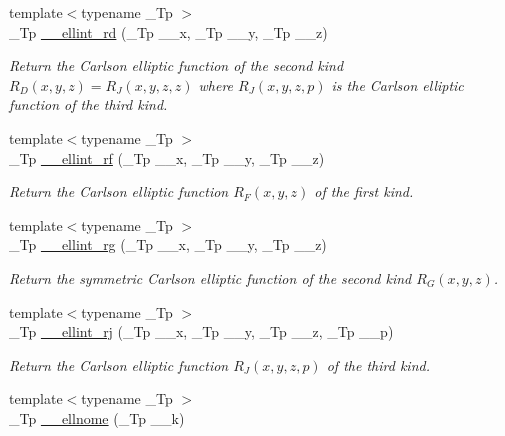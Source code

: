 \begin{DoxyCompactItemize}
{\footnotesize template$<$typename \+\_\+\+Tp $>$ }\\\+\_\+\+Tp \hyperlink{namespacestd_1_1____detail_ac05883415a662fc6f9855dd8d1da921f}{\+\_\+\+\_\+ellint\+\_\+rd} (\+\_\+\+Tp \+\_\+\+\_\+x, \+\_\+\+Tp \+\_\+\+\_\+y, \+\_\+\+Tp \+\_\+\+\_\+z)
\begin{DoxyCompactList}\small\item\em Return the Carlson elliptic function of the second kind $ R_D(x,y,z) = R_J(x,y,z,z) $ where $ R_J(x,y,z,p) $ is the Carlson elliptic function of the third kind. \end{DoxyCompactList}\item 
{\footnotesize template$<$typename \+\_\+\+Tp $>$ }\\\+\_\+\+Tp \hyperlink{namespacestd_1_1____detail_a2cca271dcbdf22923219eab7a02450d5}{\+\_\+\+\_\+ellint\+\_\+rf} (\+\_\+\+Tp \+\_\+\+\_\+x, \+\_\+\+Tp \+\_\+\+\_\+y, \+\_\+\+Tp \+\_\+\+\_\+z)
\begin{DoxyCompactList}\small\item\em Return the Carlson elliptic function $ R_F(x,y,z) $ of the first kind. \end{DoxyCompactList}\item 
{\footnotesize template$<$typename \+\_\+\+Tp $>$ }\\\+\_\+\+Tp \hyperlink{namespacestd_1_1____detail_aaceff1eb320e0602afee36c60b80f87a}{\+\_\+\+\_\+ellint\+\_\+rg} (\+\_\+\+Tp \+\_\+\+\_\+x, \+\_\+\+Tp \+\_\+\+\_\+y, \+\_\+\+Tp \+\_\+\+\_\+z)
\begin{DoxyCompactList}\small\item\em Return the symmetric Carlson elliptic function of the second kind $ R_G(x,y,z) $. \end{DoxyCompactList}\item 
{\footnotesize template$<$typename \+\_\+\+Tp $>$ }\\\+\_\+\+Tp \hyperlink{namespacestd_1_1____detail_afe05ce66130b5f47389137c3f9aa6949}{\+\_\+\+\_\+ellint\+\_\+rj} (\+\_\+\+Tp \+\_\+\+\_\+x, \+\_\+\+Tp \+\_\+\+\_\+y, \+\_\+\+Tp \+\_\+\+\_\+z, \+\_\+\+Tp \+\_\+\+\_\+p)
\begin{DoxyCompactList}\small\item\em Return the Carlson elliptic function $ R_J(x,y,z,p) $ of the third kind. \end{DoxyCompactList}\item 
{\footnotesize template$<$typename \+\_\+\+Tp $>$ }\\\+\_\+\+Tp \hyperlink{namespacestd_1_1____detail_ac94c9cd28ee7973229e4a63d9b984711}{\+\_\+\+\_\+ellnome} (\+\_\+\+Tp \+\_\+\+\_\+k)

\end{DoxyCompactItemize}
